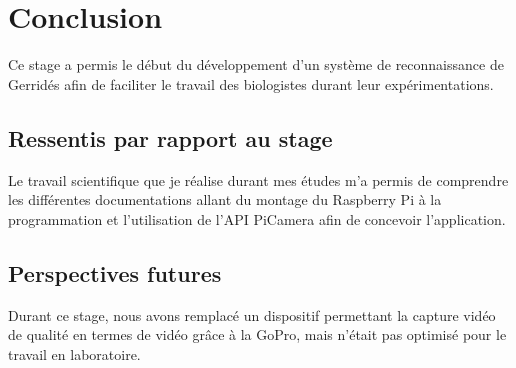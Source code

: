 \chapter{Conclusion}
    Ce stage a permis le début du développement d'un système de reconnaissance de Gerridés afin de faciliter le travail des biologistes durant leur expérimentations.
    

    \section{Ressentis par rapport au stage}
    Le travail scientifique que je réalise durant mes études m'a permis de comprendre les différentes documentations allant du montage du Raspberry Pi à la programmation et l'utilisation de l'API PiCamera afin de concevoir l'application. 







    \section{Perspectives futures}
    Durant ce stage, nous avons remplacé un dispositif permettant la capture vidéo de qualité en termes de vidéo grâce à la GoPro, mais n'était pas optimisé pour le travail en laboratoire.

